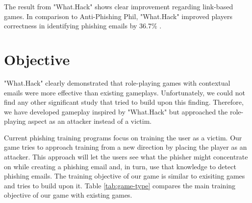 The result from "What.Hack" shows clear improvement regarding link-based games. In comparison to Anti-Phishing Phil, "What.Hack" improved players correctness in identifying phishing emails by 36.7\% \cite{what_hack}.

\section{Objective}

"What.Hack" clearly demonstrated that role-playing games with contextual emails were more effective than existing gameplays. Unfortunately, we could not find any other significant study that tried to build upon this finding. Therefore, we have developed gameplay inspired by "What.Hack" but approached the role-playing aspect as an attacker instead of a victim.

Current phishing training programs focus on training the user as a victim. Our game tries to approach training from a new direction by placing the player as an attacker. This approach will let the users see what the phisher might concentrate on while creating a phishing email and, in turn, use that knowledge to detect phishing emails. The training objective of our game is similar to exisiting games and tries to build upon it. Table \ref{tab:game-type} compares the main training objective of our game with existing games.

\begin{table}[ht]
    \caption{Different type of training games and their main objectives}
    \label{tab:game-type}
\end{table}

